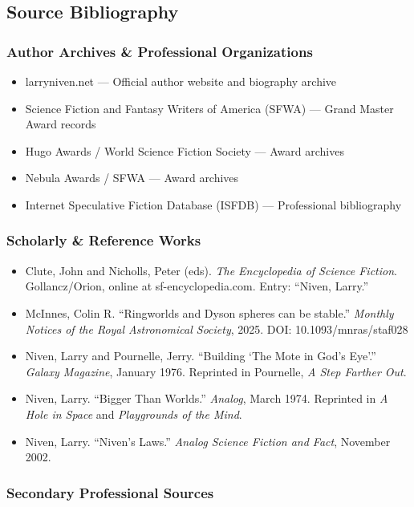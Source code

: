 \documentclass[11pt,letterpaper]{article}
\begin{document}
\subsection{Source Bibliography}

\subsubsection{Author Archives \& Professional Organizations}

\begin{itemize}[leftmargin=2em]
\item larryniven.net --- Official author website and biography archive
\item Science Fiction and Fantasy Writers of America (SFWA) --- Grand Master Award records
\item Hugo Awards / World Science Fiction Society --- Award archives
\item Nebula Awards / SFWA --- Award archives
\item Internet Speculative Fiction Database (ISFDB) --- Professional bibliography
\end{itemize}

\subsubsection{Scholarly \& Reference Works}

\begin{itemize}[leftmargin=2em]
\item Clute, John and Nicholls, Peter (eds). \textit{The Encyclopedia of Science Fiction}. Gollancz/Orion, online at sf-encyclopedia.com. Entry: ``Niven, Larry.''
\item McInnes, Colin R. ``Ringworlds and Dyson spheres can be stable.'' \textit{Monthly Notices of the Royal Astronomical Society}, 2025. DOI: 10.1093/mnras/staf028
\item Niven, Larry and Pournelle, Jerry. ``Building `The Mote in God's Eye'.'' \textit{Galaxy Magazine}, January 1976. Reprinted in Pournelle, \textit{A Step Farther Out}.
\item Niven, Larry. ``Bigger Than Worlds.'' \textit{Analog}, March 1974. Reprinted in \textit{A Hole in Space} and \textit{Playgrounds of the Mind}.
\item Niven, Larry. ``Niven's Laws.'' \textit{Analog Science Fiction and Fact}, November 2002.
\end{itemize}

\subsubsection{Secondary Professional Sources}
\end{document}
